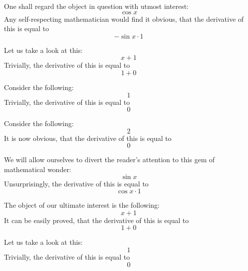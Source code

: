 \documentclass{article}
\begin{document}
One shall regard the object in question with utmost interest:
\begin{equation}
\cos x 
\end{equation}
Any self-respecting mathematician would find it obvious, that the derivative of this is equal to
\begin{equation}
-\sin x \cdot 1 
\end{equation}

Let us take a look at this:
\begin{equation}
x + 1 
\end{equation}
Trivially, the derivative of this is equal to
\begin{equation}
1 + 0 
\end{equation}

Consider the following:
\begin{equation}
1 
\end{equation}
Trivially, the derivative of this is equal to
\begin{equation}
0 
\end{equation}

Consider the following:
\begin{equation}
2 
\end{equation}
It is now obvious, that the derivative of this is equal to
\begin{equation}
0 
\end{equation}

We will allow ourselves to divert the reader's attention to this gem of mathematical wonder:
\begin{equation}
\sin x 
\end{equation}
Unsurprisingly, the derivative of this is equal to
\begin{equation}
\cos x \cdot 1 
\end{equation}

The object of our ultimate interest is the following:
\begin{equation}
x + 1 
\end{equation}
It can be easily proved, that the derivative of this is equal to
\begin{equation}
1 + 0 
\end{equation}

Let us take a look at this:
\begin{equation}
1 
\end{equation}
Trivially, the derivative of this is equal to
\begin{equation}
0 
\end{equation}
\end{document}
